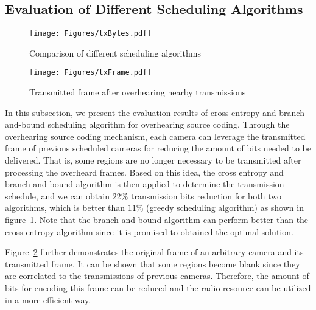 \subsection{Evaluation of Different Scheduling Algorithms}
\begin{figure}
\begin{center}
\texttt{[image: Figures/txBytes.pdf]}
\caption{\label{fig::evaScheduling}Comparison of different scheduling algorithms}
\end{center}
\end{figure}
%
\begin{figure}
\begin{center}
\texttt{[image: Figures/txFrame.pdf]}
\caption{\label{fig::evaTxFrame}Transmitted frame after overhearing nearby transmissions}
\end{center}
\end{figure}
In this subsection, we present the evaluation results of cross entropy and branch-and-bound scheduling algorithm for overhearing source coding.
Through the overhearing source coding mechanism, each camera can leverage the transmitted frame of previous scheduled cameras for reducing the amount of bits needed to be delivered.
That is, some regions are no longer necessary to be transmitted after processing the overheard frames.
Based on this idea, the cross entropy and branch-and-bound algorithm is then applied to determine the transmission schedule, and we can obtain $22\%$ transmission bits reduction for both two algorithms, which is better than $11\%$ (greedy scheduling algorithm) as shown in figure~\ref{fig::evaScheduling}.
Note that the branch-and-bound algorithm can perform better than the cross entropy algorithm since it is promised to obtained the optimal solution.

Figure~\ref{fig::evaTxFrame} further demonstrates the original frame of an arbitrary camera and its transmitted frame.
It can be shown that some regions become blank since they are correlated to the transmissions of previous cameras.
Therefore, the amount of bits for encoding this frame can be reduced and the radio resource can be utilized in a more efficient way.
%
